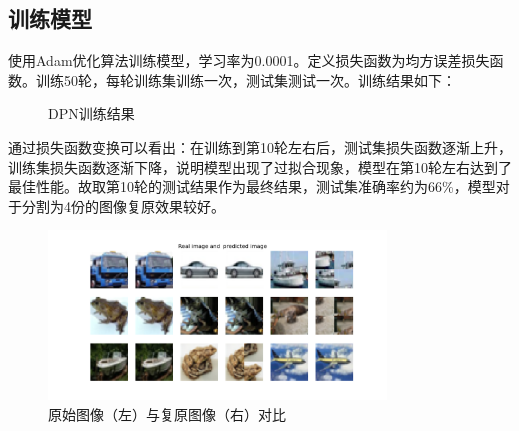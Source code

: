 \documentclass[UTF8,a4paper,12pt]{ctexart}
\begin{document}
\subsection{训练模型}
使用Adam优化算法训练模型，学习率为0.0001。定义损失函数为均方误差损失函数。训练50轮，每轮训练集训练一次，测试集测试一次。训练结果如下：

\begin{figure}[H]
    \centering
    \caption{DPN训练结果}
\end{figure}
通过损失函数变换可以看出：在训练到第10轮左右后，测试集损失函数逐渐上升，训练集损失函数逐渐下降，说明模型出现了过拟合现象，模型在第10轮左右达到了最佳性能。故取第10轮的测试结果作为最终结果，测试集准确率约为66\%，模型对于分割为4份的图像复原效果较好。

\begin{figure}[H]
    \centering
    \includegraphics[width=0.8\textwidth]{recovered images.png}
    \caption{原始图像（左）与复原图像（右）对比}
\end{figure}
\end{document}
